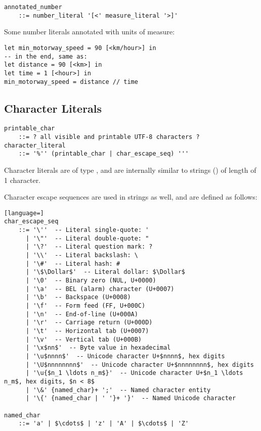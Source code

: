\syntax\begin{lstlisting}
annotated_number 
    ::= number_literal '[<' measure_literal '>]'
\end{lstlisting}

\example Some number literals annotated with units of measure:
\begin{lstlisting}
let min_motorway_speed = 90 [<km/hour>] in
-- in the end, same as:
let distance = 90 [<km>] in
let time = 1 [<hour>] in
min_motorway_speed = distance // time
\end{lstlisting}






\subsection{Character Literals}
\label{sec:characterliterals}

\syntax\begin{lstlisting}[deletekeywords={and,all}]
printable_char 
    ::= ? all visible and printable UTF-8 characters ? 
character_literal 
    ::= '%'' (printable_char | char_escape_seq) '''
\end{lstlisting}

Character literals are of type , and are internally similar to strings () of length of 1 character. 

Character escape sequences are used in strings as well, and are defined as follows: 

\syntax\begin{lstlisting}[language=]
char_escape_seq 
    ::= '\''  -- Literal single-quote: '
      | '\"'  -- Literal double-quote: "
      | '\?'  -- Literal question mark: ?
      | '\\'  -- Literal backslash: \
      | '\#'  -- Literal hash: #
      | '\$\Dollar$'  -- Literal dollar: $\Dollar$
      | '\0'  -- Binary zero (NUL, U+0000)
      | '\a'  -- BEL (alarm) character (U+0007)
      | '\b'  -- Backspace (U+0008)
      | '\f'  -- Form feed (FF, U+000C)
      | '\n'  -- End-of-line (U+000A)
      | '\r'  -- Carriage return (U+000D)
      | '\t'  -- Horizontal tab (U+0007)
      | '\v'  -- Vertical tab (U+000B)
      | '\x$nn$'  -- Byte value in hexadecimal
      | '\u$nnnn$'  -- Unicode character U+$nnnn$, hex digits
      | '\U$nnnnnnnn$'  -- Unicode character U+$nnnnnnnn$, hex digits
      | '\u{$n_1 \ldots n_m$}'  -- Unicode character U+$n_1 \ldots n_m$, hex digits, $n < 8$
      | '\&' {named_char}+ ';'  -- Named character entity
      | '\{' {named_char | ' '}+ '}'  -- Named Unicode character
      
named_char 
    ::= 'a' | $\cdots$ | 'z' | 'A' | $\cdots$ | 'Z'
\end{lstlisting}

